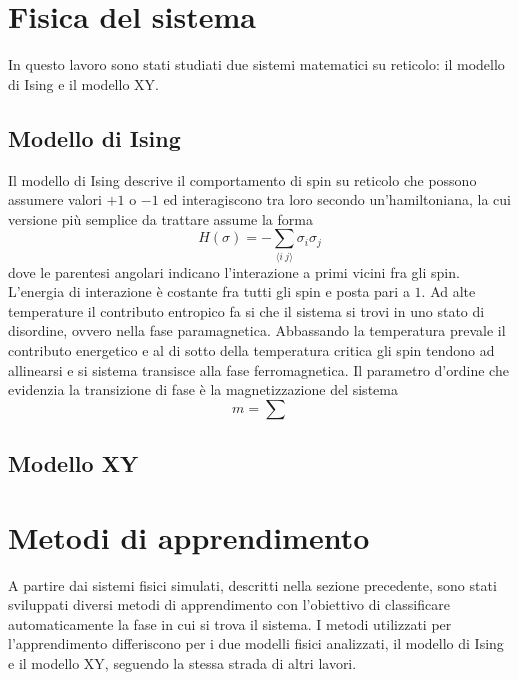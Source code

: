\documentclass{article}
\begin{document}
\section{Fisica del sistema}
In questo lavoro sono stati studiati due sistemi matematici su reticolo:  il modello di Ising e il modello XY.
\subsection{Modello di Ising}
Il modello di Ising descrive il comportamento di spin su reticolo che possono assumere valori $+1$ o $-1$ ed interagiscono tra loro secondo un'hamiltoniana, la cui versione più semplice da trattare assume la forma
\begin{equation}
H(\sigma) =- \sum_{\langle i~j\rangle} \sigma_i\sigma_j
\end{equation} 
dove le parentesi angolari indicano l'interazione a primi vicini fra gli spin. L'energia di interazione è costante fra tutti gli spin e posta pari a $1$. Ad alte temperature il contributo entropico fa si che il sistema si trovi in uno stato di disordine, ovvero nella fase paramagnetica. Abbassando la temperatura prevale il contributo energetico e al di sotto della temperatura critica gli spin tendono ad allinearsi e si sistema transisce alla fase ferromagnetica. Il parametro d'ordine che evidenzia la transizione di fase è la magnetizzazione del sistema
\begin{equation}
m=\sum
\end{equation}
\subsection{Modello XY}


\section{Metodi di apprendimento}

A partire dai sistemi fisici simulati, descritti nella sezione precedente, sono stati sviluppati diversi metodi di apprendimento con l'obiettivo di classificare automaticamente la fase in cui si trova il sistema.
I metodi utilizzati per l'apprendimento differiscono per i due modelli fisici analizzati, il modello di Ising e il modello XY, seguendo la stessa strada di altri lavori.
\end{document}
